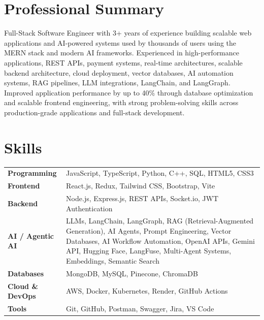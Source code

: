 \documentclass[10pt,a4paper]{moderncv}
\newcommand*{\skillrow}[2]{\textbf{#1} & #2\\[0.35mm]}
\begin{document}
\hfill
\begin{minipage}[t]{0.31\textwidth}
\footnotesize
\section{Professional Summary}
Full-Stack Software Engineer with 3+ years of experience building scalable web applications and AI-powered systems used by thousands of users using the MERN stack and modern AI frameworks. Experienced in high-performance applications, REST APIs, payment systems, real-time architectures, scalable backend architecture, cloud deployment, vector databases, AI automation systems, RAG pipelines, LLM integrations, LangChain, and LangGraph. Improved application performance by up to 40\% through database optimization and scalable frontend engineering, with strong problem-solving skills across production-grade applications and full-stack development.

\section{Skills}
\scriptsize
\begin{tabularx}{\textwidth}{@{}p{16mm}L@{}}
\skillrow{Programming}{JavaScript, TypeScript, Python, C++, SQL, HTML5, CSS3}
\skillrow{Frontend}{React.js, Redux, Tailwind CSS, Bootstrap, Vite}
\skillrow{Backend}{Node.js, Express.js, REST APIs, Socket.io, JWT Authentication}
\skillrow{AI / Agentic AI}{LLMs, LangChain, LangGraph, RAG (Retrieval-Augmented Generation), AI Agents, Prompt Engineering, Vector Databases, AI Workflow Automation, OpenAI APIs, Gemini API, Hugging Face, LangFuse, Multi-Agent Systems, Embeddings, Semantic Search}
\skillrow{Databases}{MongoDB, MySQL, Pinecone, ChromaDB}
\skillrow{Cloud \& DevOps}{AWS, Docker, Kubernetes, Render, GitHub Actions}
\skillrow{Tools}{Git, GitHub, Postman, Swagger, Jira, VS Code}
\end{tabularx}
\footnotesize


\end{minipage}
\end{document}
